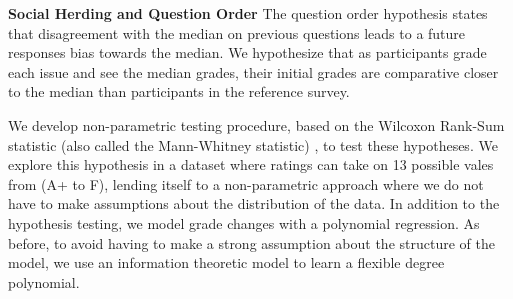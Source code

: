 \noindent \textbf{Social Herding and Question Order} The question order hypothesis states that disagreement with the median on previous questions leads to a future responses bias towards the median. We hypothesize that as participants grade each issue and see the median grades, their initial grades are comparative closer to the median than participants in the reference survey.

We develop non-parametric testing procedure, based on the Wilcoxon Rank-Sum statistic (also called the Mann-Whitney statistic) \cite{lehmann2006nonparametrics}, to test these hypotheses.
We explore this hypothesis in a dataset where ratings can take on 13 possible vales from (A+ to F), lending itself to a non-parametric approach where we do not have to make assumptions about the distribution of the data.
In addition to the hypothesis testing, we model grade changes with a polynomial regression.
As before, to avoid having to make a strong assumption about the structure of the model, we use an information theoretic model to learn a flexible degree polynomial.

